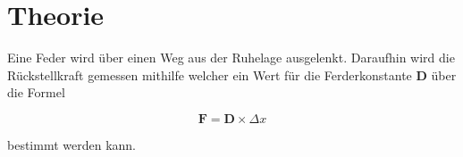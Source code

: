 \section{Theorie}
\label{sec:Theorie}

Eine Feder wird über einen Weg aus der Ruhelage ausgelenkt. Daraufhin
wird die Rückstellkraft gemessen mithilfe welcher ein Wert für die Ferderkonstante
$\symbf{D}$ über die Formel

\begin{equation}
    \symbf{F} = \symbf{D} \times \Delta x 
    \label{eq:example}
\end{equation}

bestimmt werden kann.